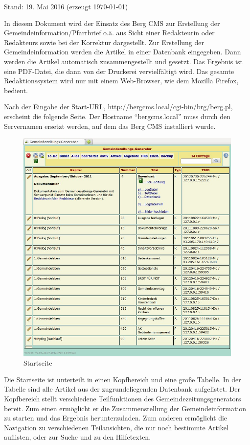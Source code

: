 \documentclass[12pt,a4paper,twoside]{article}%
\begin{document}

Stand: 19. Mai 2016 (erzeugt \today) 


In diesem Dokument wird der Einsatz des Berg CMS zur Erstellung der 
Gemeindeinformation/Pfarrbrief o.ä. aus Sicht einer Redakteurin oder Redakteurs sowie bei der 
Korrektur dargestellt. Zur Erstellung der Gemeindeinformation werden die Artikel 
in einer Datenbank eingegeben. Dann werden die Artikel automatisch zusammengestellt und gesetzt.
Das Ergebnis ist eine PDF-Datei, die dann von der Druckerei vervielfältigt wird.
Das gesamte Redaktionssystem wird nur mit einem Web-Browser, wie dem 
Mozilla Firefox, bedient.

Nach der Eingabe der Start-URL, \url{http://bergcms.local/cgi-bin/brg/berg.pl}, erscheint die folgende
Seite. Der Hostname "`bergcms.local"' muss durch den Servernamen ersetzt werden, auf dem das Berg CMS installiert wurde.


\begin{figure}[h]
\begin{center}
\includegraphics[width=0.65\linewidth]{webgui_startseite.jpeg}
\end{center}
\caption{Startseite}
\end{figure} 

Die Startseite ist unterteilt in einen Kopfbereich und eine große Tabelle.
In der Tabelle sind alle Artikel aus der zugrundeliegenden Datenbank aufgelistet.
Der Kopfbereich stellt verschiedene Teilfunktionen des Gemeindezeitungsgenerators bereit. 
Zum einen ermöglicht er die Zusammenstellung der Gemeindeinformation zu starten und das Ergebnis
herunterzuladen. Zum anderen
 ermöglicht die Navigation zu verschiedenen Teilansichten, die 
nur noch bestimmte Artikel auflisten, oder zur Suche und zu den Hilfetexten. 
\end{document}

